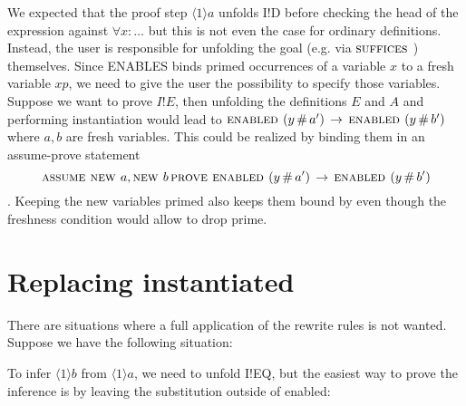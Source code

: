 \documentclass[a4paper]{article}
\newcommand{\tla}[1]{#1}
\newcommand{\impl}[0]{\,\rightarrow\,}
\newcommand{\proofstep}[2]{\langle{#1}\rangle{#2}}
\theoremstyle{definition}
\begin{document}
\begin{itemize}
We expected that the proof step $\tla{\proofstep{1}{a}}$ unfolds \tla{I!D}
 before checking the head of the expression against $\forall x : \ldots$ but
 this is not even the case for ordinary definitions. Instead, the user is
 responsible for unfolding the goal (e.g. via \tla{$\mbox{\sc suffices }$}) themselves.
 Since ENABLES binds primed occurrences of a variable $x$ to a fresh variable
 $xp$, we need to give the user the possibility to specify those variables.
 Suppose we want to prove $\tla{I!E}$, then unfolding the definitions $E$ and
 $A$ and performing instantiation would lead to
 $\tla{\ENABLED (y \dif a') \impl \ENABLED(y \dif b')}$ where $a,b$ are fresh
 variables. This could be realized by binding them in an assume-prove statement
 $$\tla{\ASSUME \NEW a, \NEW b \PROVE \ENABLED (y \dif a') \impl
   \ENABLED(y \dif b')}$$. Keeping the new variables primed also keeps them
 bound by \ENABLED even though the freshness condition would allow to drop
 prime.


\end{itemize}

\section{Replacing instantiated \ENABLED}
There are situations where a full application of the rewrite rules is not
 wanted. Suppose we have the following situation:

\begin{parcolumns}{2}
\end{parcolumns}

To infer $\proofstep{1}{b}$ from $\proofstep{1}{a}$, we need to unfold I!EQ,
 but the easiest way to prove the inference is by leaving the substitution
 outside of enabled:
\end{document}
